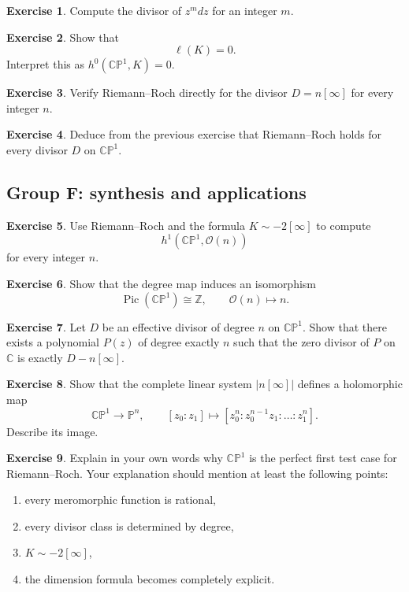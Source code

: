 \documentclass[11pt]{article}
\newcommand{\C}{\mathbb{C}}
\newcommand{\CP}{\mathbb{CP}}
\newcommand{\PP}{\mathbb{P}}
\newcommand{\OO}{\mathcal{O}}
\newcommand{\Pic}{\operatorname{Pic}}
\newcommand{\ellD}{\ell}
\newcommand{\CPone}{\CP^1}
\theoremstyle{definition}
\newtheorem{exercise}{Exercise}[section]
\theoremstyle{plain}
\begin{document}
\begin{exercise}
Compute the divisor of $z^m dz$ for an integer $m$.
\end{exercise}

\begin{exercise}
Show that
\[
\ellD(K)=0.
\]
Interpret this as $h^0(\CPone,K)=0$.
\end{exercise}

\begin{exercise}
Verify Riemann--Roch directly for the divisor $D=n[\infty]$ for every integer $n$.
\end{exercise}

\begin{exercise}
Deduce from the previous exercise that Riemann--Roch holds for every divisor $D$ on $\CPone$.
\end{exercise}

\subsection{Group F: synthesis and applications}
\begin{exercise}
Use Riemann--Roch and the formula $K\sim -2[\infty]$ to compute
\[
h^1(\CPone,\OO(n))
\]
for every integer $n$.
\end{exercise}

\begin{exercise}
Show that the degree map induces an isomorphism
\[
\Pic(\CPone)\cong \mathbb Z,
\qquad
\OO(n)\longmapsto n.
\]
\end{exercise}

\begin{exercise}
Let $D$ be an effective divisor of degree $n$ on $\CPone$. Show that there exists a polynomial $P(z)$ of degree exactly $n$ such that the zero divisor of $P$ on $\C$ is exactly $D-n[\infty]$.
\end{exercise}

\begin{exercise}
Show that the complete linear system $|n[\infty]|$ defines a holomorphic map
\[
\CPone\longrightarrow \PP^n,
\qquad
[z_0:z_1]\longmapsto [z_0^n:z_0^{n-1}z_1:\dots:z_1^n].
\]
Describe its image.
\end{exercise}

\begin{exercise}
Explain in your own words why $\CPone$ is the perfect first test case for Riemann--Roch. Your explanation should mention at least the following points:
\begin{enumerate}[label=(\alph*), leftmargin=2em]
    \item every meromorphic function is rational,
    \item every divisor class is determined by degree,
    \item $K\sim -2[\infty]$,
    \item the dimension formula becomes completely explicit.
\end{enumerate}
\end{exercise}
\end{document}

